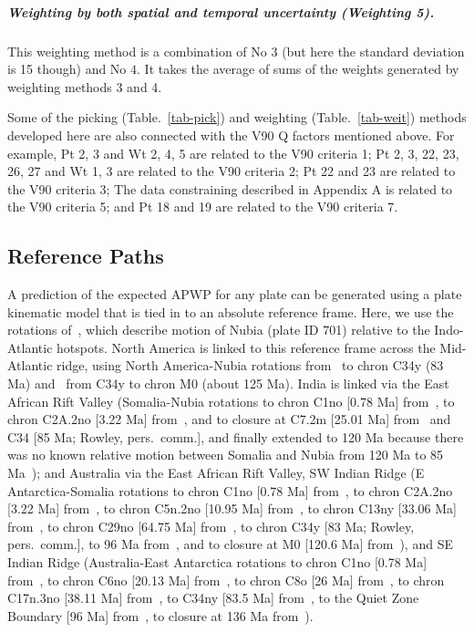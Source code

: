 \subparagraph{Weighting by both spatial and temporal uncertainty (Weighting 5).}
This weighting method is a combination of No $3$ (but here the standard
deviation is 15 though) and No $4$. It takes the average of sums of the weights
generated by weighting methods 3 and 4.

Some of the picking (Table.~\ref{tab-pick}) and weighting
(Table.~\ref{tab-weit}) methods developed here are also connected with the V90 Q
factors mentioned above. For example, Pt 2, 3 and Wt 2, 4, 5 are related to the
V90 criteria 1; Pt 2, 3, 22, 23, 26, 27 and Wt 1, 3 are related to the V90
criteria 2; Pt 22 and 23 are related to the V90 criteria 3; The data
constraining described in Appendix A is related to the V90 criteria 5; and Pt 18
and 19 are related to the V90 criteria 7.

\subsection{Reference Paths}

A prediction of the expected APWP for any plate can be generated using a plate
kinematic model that is tied in to an absolute reference frame. Here, we use
the rotations of~\cite{O05}, which describe motion of Nubia (plate ID 701)
relative to the Indo-Atlantic hotspots. North America is linked to this
reference frame across the Mid-Atlantic ridge, using North America-Nubia
rotations from~\cite{M99} to chron C34y (83 Ma) and~\cite{M97} from C34y to
chron M0 (about 125 Ma). India is linked via the East African Rift Valley
(Somalia-Nubia rotations to chron C1no [0.78 Ma] from~\cite{D17}, to chron
C2A.2no [3.22 Ma] from~\cite{H05}, and to closure at C7.2m [25.01 Ma]
from~\cite{R16} and C34 [85 Ma; Rowley, pers.\ comm.], and finally extended to
120 Ma because there was no known relative motion between Somalia and Nubia from
120 Ma to 85 Ma~\cite{M16}); and Australia via the East African Rift Valley, SW
Indian Ridge (E Antarctica-Somalia rotations to chron C1no [0.78 Ma]
from~\cite{D17}, to chron C2A.2no [3.22 Ma] from~\cite{H05}, to chron C5n.2no
[10.95 Ma] from~\cite{L02}, to chron C13ny [33.06 Ma] from~\cite{P08}, to chron
C29no [64.75 Ma] from~\cite{C10}, to chron C34y [83 Ma; Rowley, pers.\ comm.],
to 96 Ma from~\cite{M01}, and to closure at M0 [120.6 Ma] from~\cite{M08}), and
SE Indian Ridge (Australia-East Antarctica rotations to chron C1no [0.78 Ma]
from~\cite{D17}, to chron C6no [20.13 Ma] from~\cite{C04}, to chron C8o [26 Ma]
from~\cite{G18}, to chron C17n.3no [38.11 Ma] from~\cite{C04}, to C34ny [83.5
Ma] from~\cite{Wh13}, to the Quiet Zone Boundary [96 Ma] from~\cite{W07}, to
closure at 136 Ma from~\cite{Wh13}).


